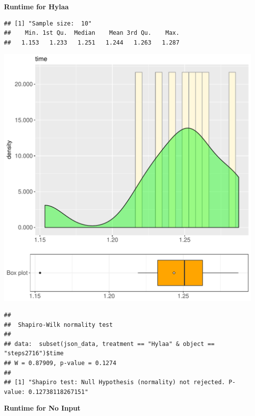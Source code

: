 \documentclass{article}\usepackage[]{graphicx}\usepackage[]{color}
\makeatletter
\def\maxwidth{ %
  \ifdim\Gin@nat@width>\linewidth
    \linewidth
  \else
    \Gin@nat@width
  \fi
}
\newenvironment{kframe}{%
 \def\at@end@of@kframe{}%
 \ifinner\ifhmode%
  \def\at@end@of@kframe{\end{minipage}}%
  \begin{minipage}{\columnwidth}%
 \fi\fi%
 \def\FrameCommand##1{\hskip\@totalleftmargin \hskip-\fboxsep
 \colorbox{shadecolor}{##1}\hskip-\fboxsep
     \hskip-\linewidth \hskip-\@totalleftmargin \hskip\columnwidth}%
 \MakeFramed {\advance\hsize-\width
   \@totalleftmargin\z@ \linewidth\hsize
   \@setminipage}}%
 {\par\unskip\endMakeFramed%
 \at@end@of@kframe}
\newenvironment{knitrout}{}{} %
\makeatother
\begin{document}
 \textbf{Runtime for Hylaa}
\begin{knitrout}
\color{fgcolor}\begin{kframe}
\begin{verbatim}
## [1] "Sample size:  10"
##    Min. 1st Qu.  Median    Mean 3rd Qu.    Max. 
##   1.153   1.233   1.251   1.244   1.263   1.287
\end{verbatim}
\end{kframe}
\includegraphics[width=\maxwidth]{figure/RH4_Hylaa_steps2716-1} 
\begin{kframe}\begin{verbatim}
## 
## 	Shapiro-Wilk normality test
## 
## data:  subset(json_data, treatment == "Hylaa" & object == "steps2716")$time
## W = 0.87909, p-value = 0.1274
## 
## [1] "Shapiro test: Null Hypothesis (normality) not rejected. P-value: 0.12738118267151"
\end{verbatim}
\end{kframe}
\end{knitrout}
 \textbf{Runtime for No Input}
\end{document}

